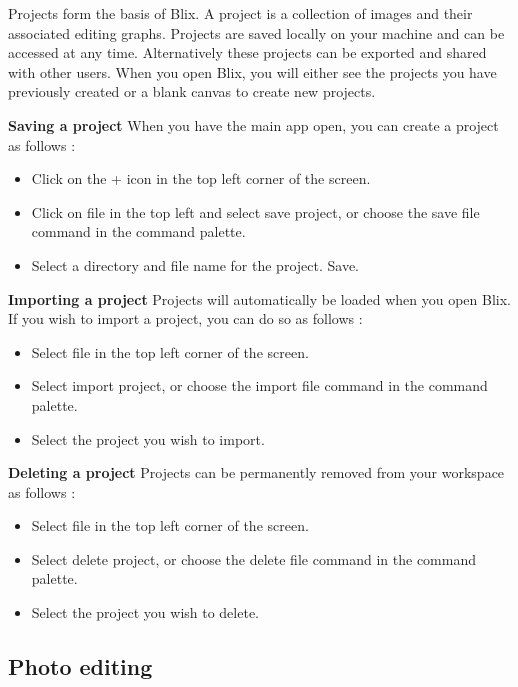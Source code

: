 \documentclass[11pt,a4paper]{article}
\begin{document}
Projects form the basis of Blix. A project is a collection of images and their associated editing graphs. Projects are saved locally on your machine and can be accessed at any time. 
Alternatively these projects can be exported and shared with other users. When you open Blix, you will either see the projects you have previously created or a blank canvas to create new projects.

\textbf{Saving a project}
When you have the main app open, you can create a project as follows : 

\begin{itemize}
  \item[\textbullet] Click on the + icon in the top left corner of the screen.
  \item[\textbullet] Click on file in the top left and select save project, or choose the save file command in the command palette.
  \item[\textbullet] Select a directory and file name for the project. Save.
\end{itemize}

\textbf{Importing a project}
Projects will automatically be loaded when you open Blix. If you wish to import a project, you can do so as follows : 

\begin{itemize}
  \item[\textbullet] Select file in the top left corner of the screen.
  \item[\textbullet] Select import project, or choose the import file command in the command palette.
  \item[\textbullet] Select the project you wish to import.
\end{itemize}

\textbf{Deleting a project}
Projects can be permanently removed from your workspace as follows : 
\begin{itemize}
  \item[\textbullet] Select file in the top left corner of the screen.
  \item[\textbullet] Select delete project, or choose the delete file command in the command palette.
  \item[\textbullet] Select the project you wish to delete.
\end{itemize}

\subsection*{Photo editing}
\end{document}
